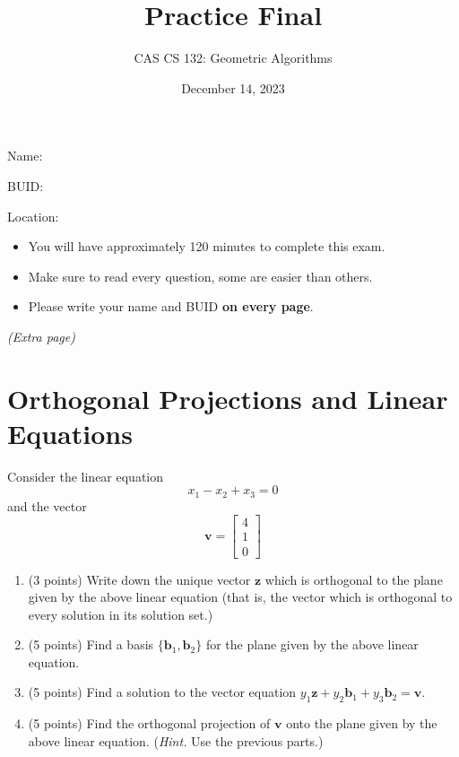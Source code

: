\documentclass{article}
\title{Practice Final
} \author{CAS CS 132: Geometric Algorithms} \date{December 14, 2023}
\theoremstyle{remark} \newtheorem*{solution}{Solution}
\newcommand{\vv}[1]{\mathbf{#1}} \newcommand{\R}{\mathbb R}
\begin{document}
\maketitle

\noindent Name:

\bigskip

\noindent BUID:

\bigskip

\noindent Location:

\bigskip

\begin{itemize}
\item You will have approximately 120 minutes to complete this exam.
\item Make sure to read every question, some are easier than others.
\item Please write your name and BUID \textbf{on every page}.
\end{itemize}

\pagebreak
\textit{(Extra page)}

\pagebreak
\section{Orthogonal Projections and Linear Equations}

Consider the linear equation
\begin{displaymath}
  x_1 - x_2 + x_3 = 0
\end{displaymath}
and the vector
\begin{displaymath}
  \vv v =
  \begin{bmatrix}
    4 \\ 1 \\ 0
  \end{bmatrix}
\end{displaymath}

\begin{enumerate}
\item (3 points) Write down the unique vector $\vv z$ which is
  orthogonal to the plane given by the above linear equation (that is,
  the vector which is orthogonal to every solution in its solution
  set.)
\item (5 points) Find a basis $\{\vv b_1, \vv b_2\}$ for the plane
  given by the above linear equation.
\item (5 points) Find a solution to the vector equation $y_1\vv z + y_2\vv
  b_1 + y_3\vv b_2 = \vv v$.
\item (5 points) Find the orthogonal projection of $\vv v$ onto the
  plane given by the above linear equation. (\textit{Hint.} Use the
  previous parts.)
\end{enumerate}
\end{document}
